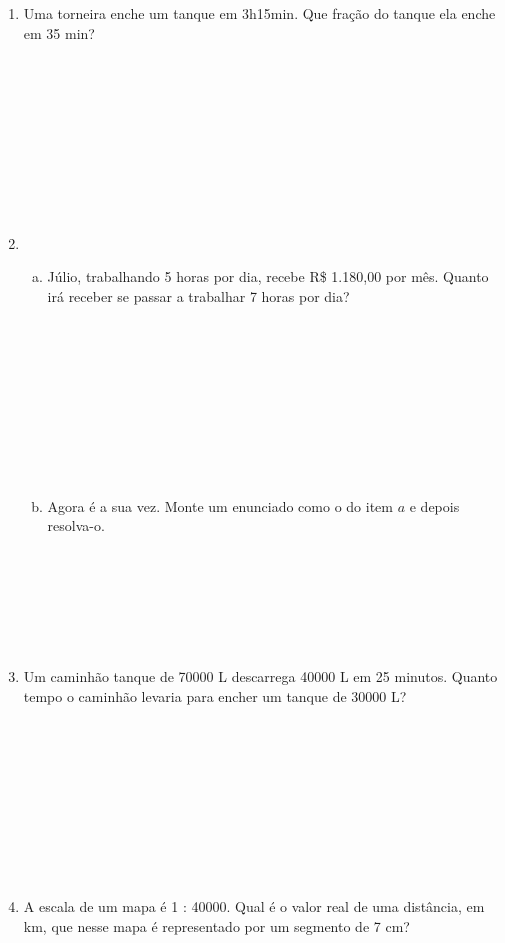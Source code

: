 \documentclass[a4paper,14pt]{article}
\begin{document}
\begin{multicols}{2}
\begin{enumerate}
	    	\item Uma torneira enche um tanque em 3h15min. Que fração do tanque ela enche em 35 min? \\\\\\\\\\\\\\\\\\\\
	    	\item ~
	    	\begin{enumerate}[a)]
	    		\item Júlio, trabalhando 5 horas por dia, recebe R\$ 1.180,00 por mês. Quanto irá receber se passar a trabalhar 7 horas por dia? \\\\\\\\\\\\\\\\\\\\
	    		\item Agora é a sua vez. Monte um enunciado como o do item $a$ e depois resolva-o. \\\\\\\\\\\\\\
	    	\end{enumerate}
    	    \item Um caminhão tanque de 70000 L descarrega 40000 L em 25 minutos. Quanto tempo o caminhão levaria para encher um tanque de 30000 L? \\\\\\\\\\\\\\\\\\\\
    	    \item A escala de um mapa é 1 : 40000. Qual é o valor real de uma distância, em km, que nesse mapa é representado por um segmento de 7 cm? \\\\\\\\\\\\\\\\\\\\

\end{enumerate}
\end{multicols}
\end{document}
